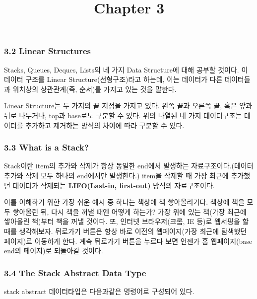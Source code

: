 \documentclass[11pt]{article}
\title{Chapter 3}
\begin{document}
    
    
    \maketitle
    
    

    
    \subsubsection{3.2 Linear Structures}\label{linear-structures}

    Stacks, Queues, Deques, Lists의 네 가지 Data Structure에 대해 공부할
것이다. 이 데이터 구조를 Linear Structure(선형구조)라고 하는데, 이는
데이터가 다른 데이터들과 위치상의 상관관계(즉, 순서)를 가지고 있는 것을
말한다.

Linear Structure는 두 가지의 끝 지점을 가지고 있다. 왼쪽 끝과 오른쪽 끝,
혹은 앞과 뒤로 나누거나, top과 base로도 구분할 수 있다. 위의 나열된 네
가지 데이터구조는 데이터를 추가하고 제거하는 방식의 차이에 따라 구분할
수 있다.

    \subsubsection{3.3 What is a Stack?}\label{what-is-a-stack}

    Stack이란 item의 추가와 삭제가 항상 동일한 end에서 발생하는
자료구조이다.(데이터 추가와 삭제 모두 하나의 end에서만 발생한다.) item을
삭제할 때 가장 최근에 추가했던 데이터가 삭제되는 \textbf{LIFO(Last-in,
first-out)} 방식의 자료구조이다.

이를 이해하기 위한 가장 쉬운 예시 중 하나는 책상에 책 쌓아올리기다.
책상에 책을 모두 쌓아올린 뒤, 다시 책을 꺼낼 때엔 어떻게 하는가? 가장
위에 있는 책(가장 최근에 쌓아올린 책)부터 책을 꺼낼 것이다. 또, 인터넷
브라우저(크롬, IE 등)로 웹서핑을 할 때를 생각해보자. 뒤로가기 버튼은
항상 바로 이전의 웹페이지(가장 최근에 탐색했던 페이지)로 이동하게 한다.
계속 뒤로가기 버튼을 누르다 보면 언젠가 홈 웹페이지(base end의 페이지)로
되돌아갈 것이다.

    \subsubsection{3.4 The Stack Abstract Data
Type}\label{the-stack-abstract-data-type}

    stack abstract 데이터타입은 다음과같은 명령어로 구성되어 있다.
\end{document}
